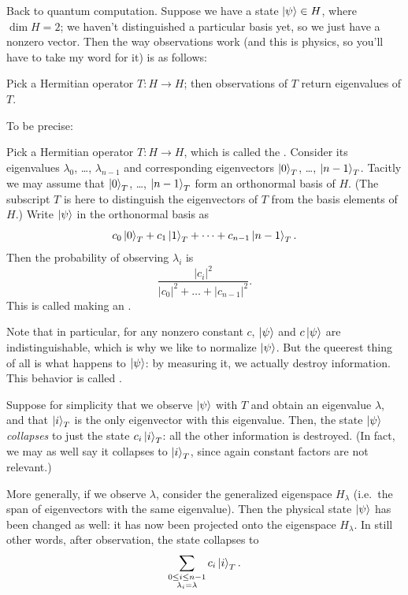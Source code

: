 Back to quantum computation.
Suppose we have a state $\ket\psi \in H$, where $\dim H = 2$;
we haven't distinguished a particular basis yet,
so we just have a nonzero vector.
Then the way observations work (and this is physics, so you'll have to
take my word for it) is as follows:
\begin{moral}
	Pick a Hermitian operator $T \colon H \to H$;
	then observations of $T$ return eigenvalues of $T$.
\end{moral}
To be precise:
\begin{itemize}
	\ii Pick a Hermitian operator $T \colon H \to H$,
	which is called the .
	\ii Consider its eigenvalues $\lambda_0$, \dots, $\lambda_{n-1}$
	and corresponding eigenvectors $\ket{0}_T$, \dots, $\ket{n-1}_T$.
	Tacitly we may assume that $\ket{0}_T$, \dots, $\ket{n-1}_T$ form
	an orthonormal basis of $H$.
	(The subscript $T$ is here to distinguish the eigenvectors of $T$
	from the basis elements of $H$.)
	\ii Write $\ket\psi$ in the orthonormal basis as
	\[ c_0\ket0_T + c_1\ket1_T + \dots + c_{n-1}\ket{n-1}_T. \]
	\ii Then the probability of observing $\lambda_i$ is
	\[ \frac{|c_i|^2}{|c_0|^2 + \dots + |c_{n-1}|^2}. \]
	This is called making an .
\end{itemize}
Note that in particular, for any nonzero constant $c$,
$\ket\psi$ and $c\ket\psi$ are indistinguishable,
which is why we like to normalize $\ket\psi$.
But the queerest thing of all is what happens to $\ket\psi$:
by measuring it, we actually destroy information.
This behavior is called .
\begin{itemize}
	\ii Suppose for simplicity that we observe $\ket\psi$
	with $T$ and obtain an eigenvalue $\lambda$,
	and that $\ket{i}_T$ is the only eigenvector with this eigenvalue.
	Then, the state $\ket\psi$ \emph{collapses} to just the state
	$c_i \ket{i}_T$: all the other information is destroyed.
	(In fact, we may as well say it collapses to $\ket{i}_T$,
	since again constant factors are not relevant.)

	\ii	More generally, if we observe $\lambda$,
	consider the generalized eigenspace $H_\lambda$
	(i.e.\ the span of eigenvectors with the same eigenvalue).
	Then the physical state $\ket\psi$ has been changed as well:
	it has now been projected onto the eigenspace $H_\lambda$.
	In still other words, after observation, the state collapses to
	\[
		\sum_{\substack{0 \le i \le n-1 \\ \lambda_i = \lambda}}
		c_i \ket{i}_T.
	\]
\end{itemize}
